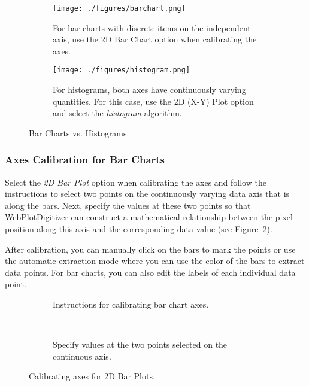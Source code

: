 \documentclass[letterpaper, 11pt]{article}
\begin{document}
\begin{figure}[h]
\centering
{\begin{subfigure}[b]{0.45\textwidth}
\texttt{[image: ./figures/barchart.png]}
\caption{For bar charts with discrete items on the independent axis, use the 2D Bar Chart option when calibrating the axes.}
\end{subfigure}
\hspace{5mm}
\begin{subfigure}[b]{0.45\textwidth}
\texttt{[image: ./figures/histogram.png]}
\caption{For histograms, both axes have continuously varying quantities. For this case, use the 2D (X-Y) Plot option and select the \emph{histogram} algorithm.}
\end{subfigure}}
\caption{Bar Charts vs. Histograms}
\label{fig:barVsHistogram}
\end{figure}


\subsubsection{Axes Calibration for Bar Charts}
Select the \emph{2D Bar Plot} option when calibrating the axes and follow the instructions to select two points on the continuously varying data axis that is along the bars. Next, specify the values at these two points so that WebPlotDigitizer can construct a mathematical relationship between the pixel position along this axis and the corresponding data value (see Figure~\ref{fig:barAlignment}).

After calibration, you can manually click on the bars to mark the points or use the automatic extraction mode where you can use the color of the bars to extract data points. For bar charts, you can also edit the labels of each individual data point.

\begin{figure}[h]
\centering
{\begin{subfigure}[b]{0.8\textwidth}
\caption{Instructions for calibrating bar chart axes.}
\end{subfigure}
\\
\vspace{5mm}
\begin{subfigure}[b]{0.6\textwidth}
\caption{Specify values at the two points selected on the continuous axis.}
\end{subfigure}}
\caption{Calibrating axes for 2D Bar Plots.}
\label{fig:barAlignment}
\end{figure}
\end{document}
